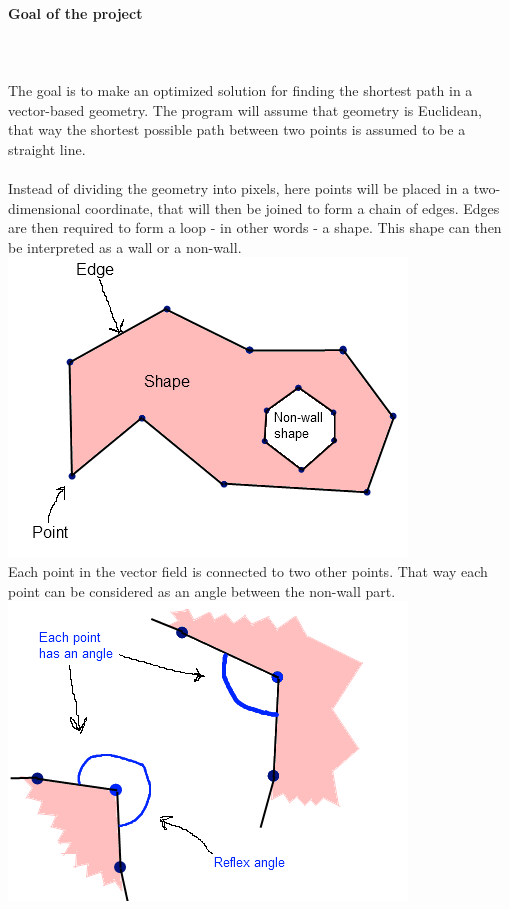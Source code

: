 \documentclass[a4paper,12pt]{article}
\begin{document}
\paragraph{Goal of the project} \hspace{0pt}
\\
\\
The goal is to make an optimized solution for finding the shortest path in a vector-based geometry. The program will assume that geometry is Euclidean, that way the shortest possible path between two points is assumed to be a straight line.
\\
\\
Instead of dividing the geometry into pixels, here points will be placed in a two-dimensional
coordinate, that will then be joined to form a chain of edges. Edges are then required to form
a loop - in other words - a shape. This shape can then be interpreted as a wall or a non-wall.
\\
\includegraphics[scale=0.65]{pointedgeshape.png}
\\
Each point in the vector field is connected to two other points. That way each point can be considered as an angle between the non-wall part.
\\
\includegraphics[scale=0.65]{pointsandangles.png}
\end{document}
